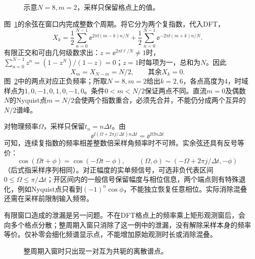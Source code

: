 \begin{figure}[H]\centering
{}
\caption{示意$N=8,m=2$，采样只保留格点上的值。}\label{fig:c4-h10-q}
\end{figure}
\begin{solution}
图~\ref{fig:c4-h10-q}的余弦在窗口内完成整数个周期。将它分为两个复指数，代入DFT，
\[X_k=\frac12\sum_{n=0}^{N-1}\ee^{2\pi\ii(m-k)n/N}
+\frac12\sum_{n=0}^{N-1}\ee^{-2\pi\ii(m+k)n/N}.\]
有限正交和可由几何级数求出：$z=\ee^{2\pi\ii\ell/N}\ne1$时，$\sum_{n=0}^{N-1}z^n=(1-z^N)/(1-z)=0$；$z=1$时每项为一，总和为$N$。因此
\[\boxed{X_m=X_{N-m}=N/2,\qquad\text{其余}X_k=0}.\]
图~\ref{fig:c4-h10-s}中的两点对应正负频率；所取$N=8,m=2$给出$k=2,6$，各点高度为$4$，时域样点为$1,0,-1,0,1,0,-1,0$。条件$0<m<N/2$保证两点不同。直流$m=0$及偶数$N$的Nyquist点$m=N/2$会使两个指数重合，必须先合并，不能仍分成两个互异的$N/2$谱峰。

对物理频率$\Omega$，采样只保留$t_n=n\Delta t$。由
\[\ee^{\ii(\Omega+2\pi j/\Delta t)n\Delta t}=\ee^{\ii\Omega n\Delta t}
\]
可知，连续复指数的频率相差整数倍采样角频率时不可辨。实余弦还具有反号等价：
\[\cos(\Omega t+\phi)=\cos(-\Omega t-\phi),\qquad
(\Omega,\phi)\sim(-\Omega+2\pi j/\Delta t,-\phi)
\]
（后式指采样序列相同）。对正幅度的实单频信号，可选非负代表区间$0\le\Omega\le\pi/\Delta t$；开区间内的一般信号保留幅度与相位信息，两个端点则有特殊退化，例如Nyquist点只看到$(-1)^n\cos\phi$，不能独立恢复任意相位。实际消除混叠还需在采样前限制输入频带。

有限窗口造成的泄漏是另一问题。不在DFT格点上的频率乘上矩形观测窗后，会向多个格点分散；整周期入窗只消除了这一例中的泄漏，没有解除采样本身的频率等价。仅补零会细化频谱显示点，不能增加原始观测时长或消除混叠。

\begin{figure}[H]\centering
{}
\caption{整周期入窗时只出现一对互为共轭的离散谱点。}\label{fig:c4-h10-s}
\end{figure}
\end{solution}

